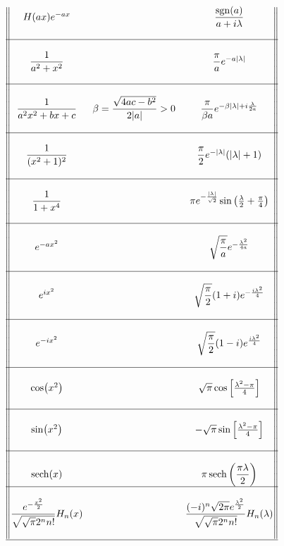 \documentclass[../complete.tex]{subfiles}
\begin{document}
\begin{center}
\begin{equation*}
\begin{Vmatrix}
		H(ax)e^{-ax} && \dfrac{\sgn(a)}{a+i\lambda} \\
		\\\hline\\
		\dfrac{1}{a^2+x^2} && \dfrac{\pi}{a}e^{-a\abs{\lambda}} \\
		\\\hline\\
		\dfrac{1}{a^2x^2+bx+c} & \beta=\dfrac{\sqrt{4ac-b^2}}{2\abs{a}}>0 & \dfrac{\pi}{\beta a} e^{-\beta\abs{\lambda}+i\frac{\lambda}{2a}}  \\
		\\\hline\\
		\dfrac{1}{(x^2+1)^2} & & \dfrac{\pi}{2}e^{-\abs{\lambda}}(\abs{\lambda}+1) \\
		\\\hline\\
		\dfrac{1}{1+x^4}&& \pi e^{-\frac{\abs{\lambda}}{\sqrt{2}}}\sin\left(\frac{\lambda}{2}+\frac{\pi}{4}\right) \\
		\\\hline\\
		e^{-ax^2} && \sqrt{\dfrac{\pi}{a}}e^{-\frac{\lambda^2}{4a}} \\
		\\\hline\\
		e^{ix^2} && \sqrt{\dfrac{\pi}{2}}(1+i)e^{-\frac{i\lambda^2}{4}}\\
		\\\hline\\
		e^{-ix^2}&&\sqrt{\dfrac{\pi}{2}}(1-i)e^{\frac{i\lambda^2}{4}}\\
		\\\hline\\
		\cos(x^2) & &\sqrt{\pi}\cos\left[ \frac{\lambda^2-\pi}{4} \right] \\
		\\\hline\\
		\sin(x^2)  && -\sqrt{\pi}\sin\left[ \frac{\lambda^2-\pi}{4} \right] \\
		\\\hline\\
		\sech(x)&&\pi\sech\left( \dfrac{\pi\lambda}{2} \right)
		\\\hline\\
		\dfrac{e^{-\frac{x^2}{2}}}{\sqrt{\sqrt{\pi}2^nn!}}H_n(x) && \dfrac{(-i)^n\sqrt{2\pi}e^{\frac{\lambda^2}{2}}}{\sqrt{\sqrt{\pi}2^nn!}}H_n(\lambda) \\
		\\\hline
	\end{Vmatrix}
\end{equation*}
\end{center}
\end{document}
